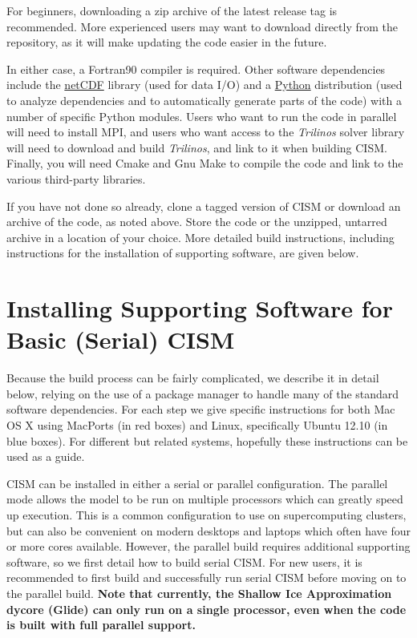 For beginners, downloading a zip archive of the latest release tag is recommended. 
More experienced users may want to download directly from the repository, 
as it will make updating the code easier in the future.

In either case, a Fortran90 compiler is required.  
Other software dependencies include the \href{http://www.unidata.ucar.edu/packages/netcdf/index.html}{netCDF} library 
(used for data I/O) and a \href{http://www.python.org}{Python} distribution 
(used to analyze dependencies and to automatically generate parts of the code) 
with a number of specific Python modules. Users who want to run the code in parallel will need to install MPI, 
and users who want access to the \textit{Trilinos} solver library will need to 
download and build \textit{Trilinos}, and link to it when building CISM. 
Finally, you will need Cmake and Gnu Make to compile the code and link to the various third-party libraries. 

If you have not done so already, clone a tagged version of CISM or download an archive of the code, as noted above. Store the code or the unzipped, untarred archive in a location of your choice. More detailed build instructions, including instructions for the installation of supporting software, are given below.

\section{Installing Supporting Software for Basic (Serial) CISM}

Because the build process can be fairly complicated, we describe it in detail below, 
relying on the use of a package manager to handle many of the standard software dependencies. 
For each step we give specific instructions for both Mac OS X using MacPorts (in red boxes) and
Linux, specifically Ubuntu 12.10 (in blue boxes).  For different but related systems,
hopefully these instructions can be used as a guide.

CISM can be installed in either a serial or parallel configuration. The parallel mode
allows the model to be run on multiple processors which can greatly speed up execution.
This is a common configuration to use on supercomputing clusters, but can also be 
convenient on modern desktops and laptops which often have four or more cores available.
However, the parallel build requires additional supporting software, so we first 
detail how to build serial CISM.  For new users, it is recommended to first build
and successfully run serial CISM before moving on to the parallel build.  \textbf{Note
that currently, the Shallow Ice Approximation dycore (Glide) can only run on a single processor, 
even when the code is built with full parallel support.}

